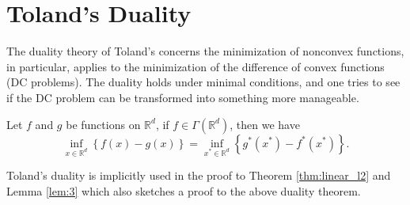 \documentclass[12pt]{article}
\begin{document}
\section{Toland's Duality}
The duality theory of Toland's \citep{toland1978duality_nonconvex,toland1979duality_principle} concerns the minimization of nonconvex functions, in particular, applies to the minimization of the difference of convex functions (DC problems). The duality holds under minimal conditions, and one tries to see if the DC problem can be transformed into something more manageable. 
\begin{theorem}
\label{thm:toland}
    Let $f$ and $g$ be functions on $\mathbb{R}^d$, if $f\in \Gamma\left(\mathbb{R}^d\right)$, then we have \[
    \inf_{x\in \mathbb{R}^d}\left\{f(x)-g(x) \right\} = \inf_{x^*\in \mathbb{R}^d}\left\{g^*(x^*) - f^*(x^*) \right\}.
    \]
\end{theorem}
Toland's duality is implicitly used in the proof to Theorem \ref{thm:linear_l2} and Lemma \ref{lem:3} which also sketches a proof to the above duality theorem.
\newpage
\end{document}
